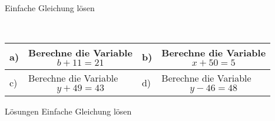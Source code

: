 \documentclass[12pt]{article}
\begin{document}
\centerline{{\Large Einfache Gleichung lösen}} 
\vspace{1cm}
\noindent \\


\begin{xltabular}{\textwidth}{|C{0.75cm}|X|C{0.75cm}|X|}
\hline
a)&Berechne die Variable$$b+11 = 21$$
&
b)&Berechne die Variable$$x+50 = 5$$
\\\hline
c)&Berechne die Variable$$y+49 = 43$$
&
d)&Berechne die Variable$$y-46 = 48$$
\\\hline
\end{xltabular}
\vspace{0.5cm}
\newpage
{}
\centerline{{\large Lösungen Einfache Gleichung lösen}} 
\vspace{0.5cm}
\end{document}

